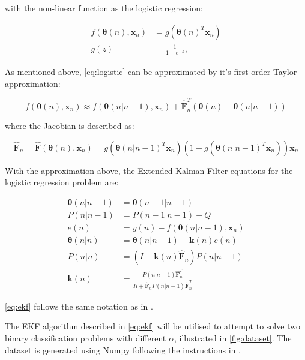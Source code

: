 \documentclass{article}
\begin{document}
with the non-linear function as the logistic regression:

\begin{equation}
    \begin{split}
        f(\pmb{\theta}(n), \pmb{x}_n) &= g(\pmb{\theta}(n)^T \pmb{x}_n)\\
        g(z) &= \frac{1}{1 + e^{-z}},
    \end{split}
    \label{eq:logistic}
\end{equation}

As mentioned above, \cref{eq:logistic} can be approximated by it's first-order Taylor approximation:

\begin{equation}
    f(\pmb{\theta}(n), \pmb{x}_n) \approx f(\pmb{\theta}(n|n-1), \pmb{x}_n) + \pmb{\hat{F}}_n^T (\pmb{\theta}(n) - \pmb{\theta}(n|n-1))
\end{equation}
    
where the Jacobian is described as:

\begin{equation}
     \pmb{\hat{F}}_n = \pmb{\hat{F}}(\pmb{\theta}(n), \pmb{x}_n) = g(\pmb{\theta}(n|n-1)^T \pmb{x}_n)(1 - g(\pmb{\theta}(n|n-1)^T \pmb{x}_n)) \pmb{x}_n
\end{equation}

With the approximation above, the Extended Kalman Filter equations for the logistic regression problem are:

\begin{equation}
    \begin{split}
        \pmb{\theta}(n|n-1) &= \pmb{\theta}(n-1|n-1)\\
        P(n|n-1) &= P(n-1|n-1) + Q\\
        e(n) &= y(n) - f(\pmb{\theta}(n|n-1), \pmb{x}_n)\\
        \pmb{\theta}(n|n) &= \pmb{\theta}(n|n-1) + \pmb{k}(n)e(n)\\
        P(n|n) &= (I - \pmb{k}(n) \pmb{\hat{F}}_n) P(n|n-1)\\
        \pmb{k}(n) &= \frac{P(n|n-1) \pmb{\hat{F}}_n^T}{R + \pmb{\hat{F}}_n P(n|n-1) \pmb{\hat{F}}_n^T}
    \end{split}
    \label{eq:ekf}
\end{equation}

\cref{eq:ekf} follows the same notation as in \cite{lab3}.

The EKF algorithm described in \cref{eq:ekf} will be utilised to attempt to solve two binary classification problems with different $\alpha$, illustrated in \cref{fig:dataset}. The dataset is generated using Numpy following the instructions in \cite{lab3}.
\end{document}
